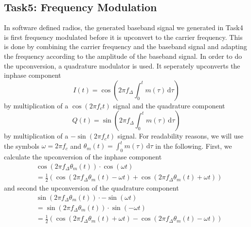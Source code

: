 \documentclass[sigconf]{acmart}
\begin{document}
\hypertarget{Task5:ux20Frequencyux20Modulation}{%
\subsection{Task5: Frequency
Modulation}\label{Task5:ux20Frequencyux20Modulation}}
In software defined radios, the generated baseband signal we generated in Task4 is first frequency
modulated before it is upconvert to the carrier frequency. This is done by combining the carrier frequency
and the baseband signal and adapting the frequency according to the amplitude of the baseband signal.
In order to do the upconversion, a quadrature modulator is used. It seperately upconverts the inphase component
\[
I(t) = \cos (2 \pi f_\Delta \int_0^t m(\tau)\,\mathrm{d}\tau)
\]
by multiplication of a \( \cos(2 \pi f_c t) \) signal and the quadrature component
\[
Q(t) = \sin (2 \pi f_\Delta \int_0^t m(\tau)\,\mathrm{d}\tau)
\]
by multiplication of a \( -\sin(2 \pi f_c t) \)  signal. For readability reasons, we will
use the symbols \( \omega = 2 \pi f_c \) and \( \theta_m (t) = \int_0^t m(\tau)\,\mathrm{d}\tau \)
in the following. First, we calculate the upconversion of the inphase component
\begin{align*}
&\cos (2 \pi f_\Delta \theta_m (t)) \cdot \cos(\omega t)\\
&= \frac{1}{2}(\cos (2 \pi f_\Delta \theta_m (t) - \omega t) + \cos (2 \pi f_\Delta \theta_m (t) + \omega t))
\end{align*}
and second the upconversion of the quadrature component
\begin{align*}
&\sin (2 \pi f_\Delta \theta_m (t)) \cdot -\sin(\omega t)\\
&= \sin (2 \pi f_\Delta \theta_m (t)) \cdot \sin(-\omega t)\\
&= \frac{1}{2}(\cos (2 \pi f_\Delta \theta_m (t) + \omega t) - \cos (2 \pi f_\Delta \theta_m (t) - \omega t))
\end{align*}
\end{document}
